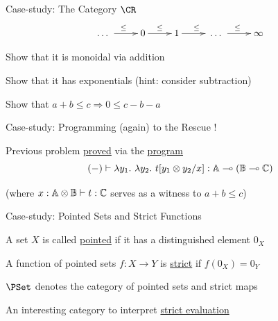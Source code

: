 \documentclass{beamer}
\begin{document}
\begin{frame}{Case-study: The Category $\CR$}
        \[
                \xymatrix{
                        \dots\ \ar[r]^{\leq} 
                        & 
                        0  \ar[r]^{\leq} 
                        &
                        1 \ar[r]^{\leq}
                        & 
                        \> \dots\ \ar[r]^{\leq} 
                        &
                        \infty
                }
        \]

        \bigskip
        \bigskip
        Show that it is monoidal via addition

        Show that it has exponentials \hspace{6cm}
        {\small (hint: consider subtraction)}

        Show that $a + b \leq c \Rightarrow 0 \leq c - b - a$

\end{frame}

\begin{frame}{Case-study: Programming (again) to the Rescue !}

        Previous problem \alert{\underline{proved}} via the
        \alert{\underline{program}}
        \[
                (-) \vdash \lambda y_1.\ \lambda y_2.\ t[y_1 \otimes y_2/x] :
                \mathbb{A} \multimap (\mathbb{B} \multimap \mathbb{C})
        \]

        {\small (where $x : \mathbb{A} \otimes \mathbb{B} \vdash t : \mathbb{C}$ serves as a witness
        to $a + b \leq c$) }
\end{frame}


\begin{frame}{Case-study: Pointed Sets and Strict Functions}

        \begin{definition}
                A set $X$ is called \alert{\underline{pointed}} if it has
                a distinguished element $0_X$
        \end{definition}

        \medskip
        \begin{definition}
                A function of pointed sets $f : X \to Y$ is
                \alert{\underline{strict}} if $f(0_X) = 0_Y$
        \end{definition}

        \medskip
        \pause
        $\PSet$ denotes the category of pointed sets and strict maps

        \medskip
        \pause
        An interesting category to interpret \alert{\underline{strict evaluation}}
\end{frame}
\end{document}

